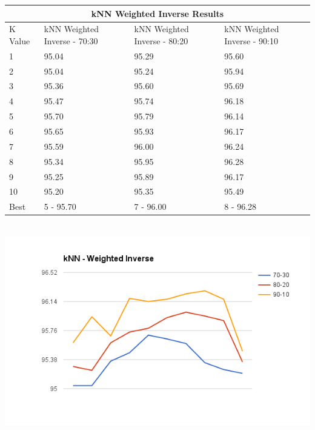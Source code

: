 \documentclass[paper=a4, fontsize=11pt]{scrartcl}
\numberwithin{equation}{section}		%
\numberwithin{figure}{section}			%
\numberwithin{table}{section}				%
\begin{document}
\begin{tabular}{ |p{2cm}||p{4cm}|p{4cm}|p{4cm}| }
 \hline
 \multicolumn{4}{|c|}{kNN Weighted Inverse Results} \\
 \hline
K Value & kNN Weighted Inverse - 70:30 & kNN Weighted Inverse - 80:20 & kNN Weighted Inverse - 90:10\\
 \hline
1 & 95.04 & 95.29 & 95.60 \\
2 & 95.04 & 95.24 & 95.94 \\
3 & 95.36 & 95.60 & 95.69 \\
4 & 95.47 & 95.74 & 96.18 \\
5 & 95.70 & 95.79 & 96.14 \\
6 & 95.65 & 95.93 & 96.17 \\
7 & 95.59 & 96.00 & 96.24 \\
8 & 95.34 & 95.95 & 96.28 \\
9 & 95.25 & 95.89 & 96.17 \\
10 & 95.20 & 95.35 & 95.49 \\
 \hline
 Best & 5 - 95.70 & 7 - 96.00 & 8 - 96.28 \\
 \hline
\end{tabular}
\\
\includegraphics[width=\textwidth]{knninverse.png}
\\
\end{document}
